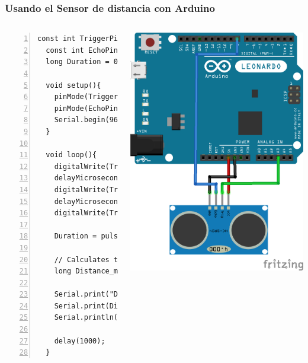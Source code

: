 \documentclass[compress]{beamer}
\begin{document}
\begin{frame}[fragile]
\frametitle{Usando el Sensor de distancia con Arduino}
\begin{columns}
  \begin{Verbatim}[formatcom=\color{red},fontseries=b, numbers=left,numbersep=3pt,fontsize=\tiny]
  const int TriggerPinA = A3;
  const int EchoPinA = 8;
  long Duration = 0;
  
  void setup(){
    pinMode(TriggerPinA, OUTPUT)
    pinMode(EchoPinA, INPUT);
    Serial.begin(9600);
  }
  
  void loop(){ 
    digitalWrite(TriggerPinA, LOW);                   
    delayMicroseconds(2);
    digitalWrite(TriggerPinA, HIGH);
    delayMicroseconds(10);
    digitalWrite(TriggerPinA, LOW);
   
    Duration = pulseIn(EchoPinA, HIGH);

    // Calculates the Distance in mm
    long Distance_mm = ((Duration /2.9) / 2);
   
    Serial.print("Distance = ");
    Serial.print(Distance_mm);
    Serial.println(" mm");
   
    delay(1000);
  }
    \end{Verbatim} 

   \includegraphics[width=\columnwidth]{./img/arduino_hc-sr04.png}

\end{columns}
\end{frame}
\end{document}
